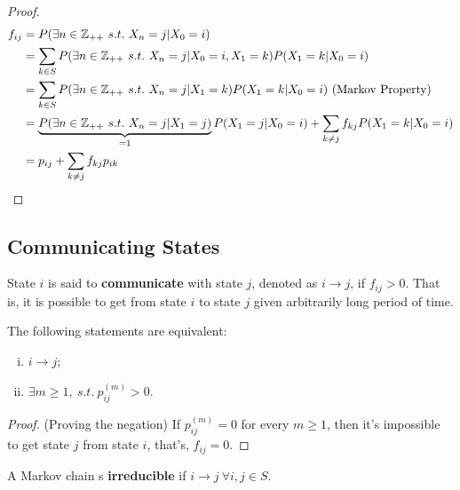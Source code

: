 \documentclass{article}
\begin{document}
    \begin{proof}
    	\begin{align}
	    	f_{ij} &= P(\exists n \in \mathbb{Z}_{++} \ s.t.\ X_n = j|X_0 = i) \\
	    	&= \sum_{k \in S} P(\exists n \in \mathbb{Z}_{++} \ s.t.\ X_n = j|X_0 = i, X_1 = k) P(X_1=k|X_0=i) \\
	    	&= \sum_{k \in S} P(\exists n \in \mathbb{Z}_{++} \ s.t.\ X_n = j| X_1 = k) P(X_1=k|X_0=i) \text{{ (Markov Property)}} \\
	    	&= \underbrace{P(\exists n \in \mathbb{Z}_{++} \ s.t.\ X_n = j| X_1 = j)}_{=1} P(X_1=j|X_0=i)
	    	+ \sum_{k \neq j} f_{kj} P(X_1=k|X_0=i) \\
	    	&= p_{ij} + \sum_{k \neq j} f_{kj} p_{ik}
    	\end{align}
    \end{proof}

	\subsection{Communicating States}

    \begin{definition}
    	State $i$ is said to \textbf{communicate} with state $j$, denoted as $i \to j$, if $f_{ij} > 0$. That is, it is possible to get from state $i$ to state $j$ given arbitrarily long period of time.
    \end{definition}
    
    \begin{proposition}
    	The following statements are equivalent:
    	\begin{enumerate}[(i)]
    		\item $i \to j$;
    		\item $\exists m \geq 1,\ s.t.\ p_{ij}^{(m)} > 0$.
    	\end{enumerate}
    \end{proposition}
    
    \begin{proof}
    	(Proving the negation) If $p^{(m)}_{ij} = 0$ for every $m \geq 1$, then it's impossible to get state $j$ from state $i$, that's, $f_{ij} = 0$.
    \end{proof}
    
    \begin{definition}
    	A Markov chain s \textbf{irreducible} if $i \to j\ \forall i,j \in S$.
    \end{definition}
    
    
\end{document}
